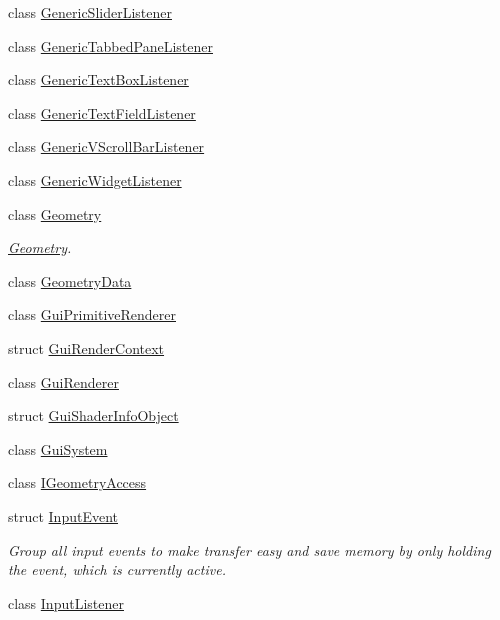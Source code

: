 \begin{DoxyCompactItemize}
\item 
class \mbox{\hyperlink{classec_1_1_generic_slider_listener}{Generic\+Slider\+Listener}}
\item 
class \mbox{\hyperlink{classec_1_1_generic_tabbed_pane_listener}{Generic\+Tabbed\+Pane\+Listener}}
\item 
class \mbox{\hyperlink{classec_1_1_generic_text_box_listener}{Generic\+Text\+Box\+Listener}}
\item 
class \mbox{\hyperlink{classec_1_1_generic_text_field_listener}{Generic\+Text\+Field\+Listener}}
\item 
class \mbox{\hyperlink{classec_1_1_generic_v_scroll_bar_listener}{Generic\+V\+Scroll\+Bar\+Listener}}
\item 
class \mbox{\hyperlink{classec_1_1_generic_widget_listener}{Generic\+Widget\+Listener}}
\item 
class \mbox{\hyperlink{classec_1_1_geometry}{Geometry}}
\begin{DoxyCompactList}\small\item\em \mbox{\hyperlink{classec_1_1_geometry}{Geometry}}. \end{DoxyCompactList}\item 
class \mbox{\hyperlink{classec_1_1_geometry_data}{Geometry\+Data}}
\item 
class \mbox{\hyperlink{classec_1_1_gui_primitive_renderer}{Gui\+Primitive\+Renderer}}
\item 
struct \mbox{\hyperlink{structec_1_1_gui_render_context}{Gui\+Render\+Context}}
\item 
class \mbox{\hyperlink{classec_1_1_gui_renderer}{Gui\+Renderer}}
\item 
struct \mbox{\hyperlink{structec_1_1_gui_shader_info_object}{Gui\+Shader\+Info\+Object}}
\item 
class \mbox{\hyperlink{classec_1_1_gui_system}{Gui\+System}}
\item 
class \mbox{\hyperlink{classec_1_1_i_geometry_access}{I\+Geometry\+Access}}
\item 
struct \mbox{\hyperlink{structec_1_1_input_event}{Input\+Event}}
\begin{DoxyCompactList}\small\item\em Group all input events to make transfer easy and save memory by only holding the event, which is currently active. \end{DoxyCompactList}\item 
class \mbox{\hyperlink{classec_1_1_input_listener}{Input\+Listener}}
\item 

\end{DoxyCompactItemize}
